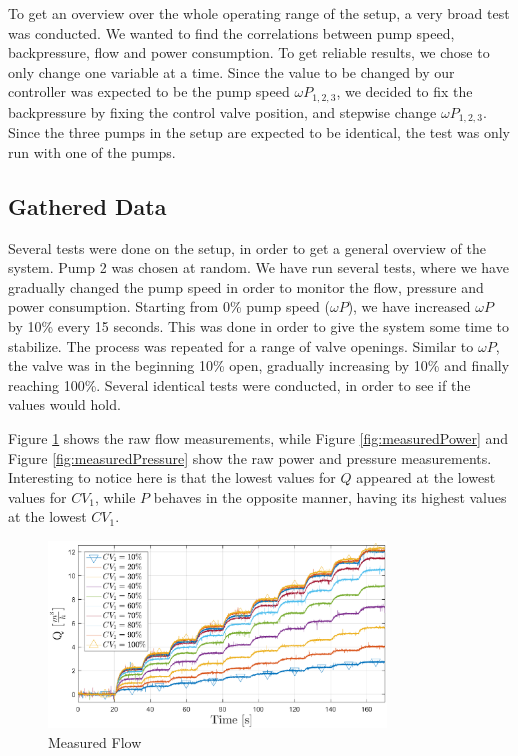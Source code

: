 To get an overview over the whole operating range of the setup,
a very broad test was conducted.
We wanted to find the correlations between pump speed, backpressure, flow and power consumption.
To get reliable results, we chose to only change one variable at a time.
Since the value to be changed by our controller was expected to be the pump speed $\omega P_{1,2,3}$,
we decided to fix the backpressure by fixing the control valve position,
and stepwise change $\omega P_{1,2,3}$.
Since the three pumps in the setup are expected to be identical,
the test was only run with one of the pumps.


\subsection{Gathered Data}
Several tests were done on the setup, in order to get a general overview of the system.
Pump 2 was chosen at random.
We have run several tests, where we have gradually changed the pump speed in order to monitor
the flow, pressure and power consumption.
Starting from 0\% pump speed ($\omega P$), we have increased $\omega P$ by 10\% every 15 seconds.
This was done in order to give the system some time to stabilize.
The process was repeated for a range of valve openings.
Similar to $\omega P$, the valve was in the beginning 10\% open,
gradually increasing by 10\% and finally reaching 100\%.
Several identical tests were conducted, in order to see if the values would hold.

Figure \ref{fig:measuredFlow} shows the raw flow measurements,
while Figure \ref{fig:measuredPower} and Figure \ref{fig:measuredPressure} show the
raw power and pressure measurements.
Interesting to notice here is that the lowest values for $Q$ appeared at the lowest values for $CV_1$,
while $P$ behaves in the opposite manner, having its highest values at the lowest $CV_1$.
\begin{figure}[H]
	\centering
	\includegraphics[width=0.8\textwidth]{figures/05mathematicalModelling/measuredFlow.eps}
	\caption{Measured Flow}
	\label{fig:measuredFlow}
\end{figure}

